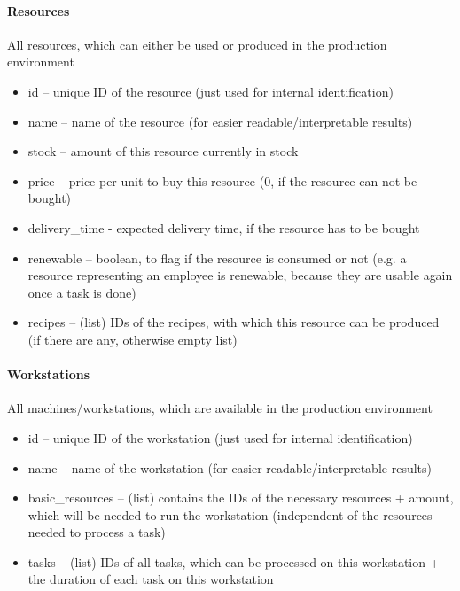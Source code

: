 \documentclass[a4paper,12pt,twoside]{scrreprt}
\begin{document}
\paragraph{Resources}
All resources, which can either be used or produced in the production environment
\begin{itemize}
	\item id – unique ID of the resource (just used for internal identification)
	\item name – name of the resource (for easier readable/interpretable results)
	\item stock – amount of this resource currently in stock
	\item price – price per unit to buy this resource (0, if the resource can not be bought)
	\item delivery\_time - expected delivery time, if the resource has to be bought
	\item renewable – boolean, to flag if the resource is consumed or not (e.g. a resource representing an employee is renewable, because they are usable again once a task is done)
	\item recipes – (list) IDs of the recipes, with which this resource can be produced (if there are any, otherwise empty list)
\end{itemize}
\paragraph{Workstations}
\label{workstation}
All machines/workstations, which are available in the production environment
\begin{itemize}
	\item id – unique ID of the workstation (just used for internal identification)
	\item name – name of the workstation (for easier readable/interpretable results)
	\item basic\_resources – (list) contains the IDs of the necessary resources + amount, which will be needed to run the workstation (independent of the resources needed to process a task)
	\item tasks – (list) IDs of all tasks, which can be processed on this workstation + the duration of each task on this workstation
\end{itemize}
\end{document}
